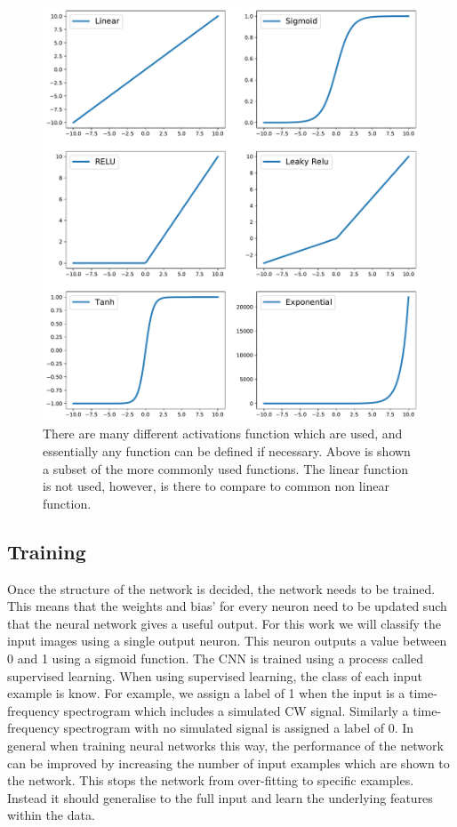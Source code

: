 \begin{figure}[h]
	\centering
	\includegraphics[width=\columnwidth]{C4_cnn/activations.pdf}
	\caption{There are many different activations function which are used, and essentially any function can be defined if necessary. Above is shown a subset of the more commonly used functions. The linear function is not used, however, is there to compare to common non linear function.}
	\label{machine:nn:activation:plot}
\end{figure}


\subsection{\label{machine:nn:training}Training}

%
Once the structure of the network is decided, the network needs to be trained.
This means that the weights and bias' for every neuron need to be updated such
that the neural network gives a useful output. For this
work we will classify the input images using a single output neuron.
This neuron outputs a value between 0 and 1 using a sigmoid function.
The \ac{CNN} is trained using a process called supervised
learning. When using supervised learning, the class of each input example is know. For example, we assign a label of 1 when the
input is a time-frequency spectrogram which includes a simulated \ac{CW}
signal. Similarly a time-frequency spectrogram with no simulated signal is assigned a label of 0. 
In general when training neural networks this way, the performance of the network can be improved by increasing the number of input examples which are shown to the network.
This stops the network from over-fitting to specific examples. Instead it should generalise to the full input and learn the underlying features within the data.

